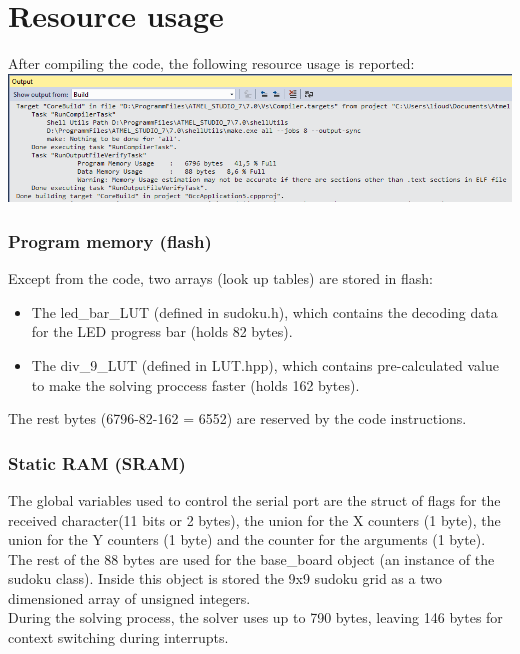\documentclass[12pt, a4, hidelinks]{article}
\begin{document}
\section*{Resource usage}
After compiling the code, the following resource usage is reported: \\
\includegraphics[width = \textwidth]{RESOURCES.png} 

\subsubsection*{Program memory (flash)}
Except from the code, two arrays (look up tables) are stored in flash: 
\begin{itemize}
\item The led\_bar\_LUT (defined in sudoku.h), which contains the decoding data for the LED progress bar (holds 82 bytes).
\item The div\_9\_LUT (defined in LUT.hpp), which contains pre-calculated value to make the solving proccess faster (holds 162 bytes).
\end{itemize}
The rest bytes (6796-82-162 = 6552) are reserved by the code instructions.

\subsubsection*{Static RAM (SRAM)}
The global variables used to control the serial port are the struct of flags for the received character(11 bits or 2 bytes), the union for the X counters (1 byte), the union for the Y counters (1 byte) and the counter for the arguments (1 byte). The rest of the 88 bytes are used for the base\_board object (an instance of the sudoku class). Inside this object is stored the 9x9 sudoku grid as a two dimensioned array of unsigned integers. \\
During the solving process, the solver uses up to 790 bytes, leaving 146 bytes for context switching during interrupts.
\end{document}
